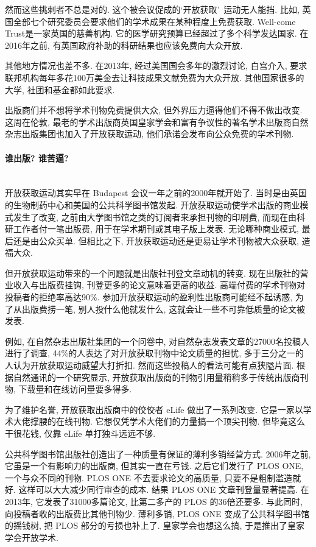 \documentclass[a4paper, 12pt, UTF8]{article}
\begin{document}
然而这些挑刺者不总是对的. 这个被会议促成的\lq 开放获取\rq\ 运动无人能挡. 比如, 英国全部七个研究委员会要求他们的学术成果在某种程度上免费获取. Well-come Trust是一家英国的慈善机构. 它的医学研究预算已经超过了多个科学发达国家. 在2016年之前, 有英国政府补助的科研结果也应该免费向大众开放.

其他地方情况也差不多. 在2013年, 经过美国国会多年的激烈讨论, 白宫介入, 要求联邦机构每年多花100万美金去让科技成果文献免费为大众开放. 其他国家很多的大学, 社团和基金都如此要求.

出版商们并不想将学术刊物免费提供大众, 但外界压力逼得他们不得不做出改变. 这周在伦敦, 最老的学术出版商英国皇家学会和富有争议性的著名学术出版商自然杂志出版集团也加入了开放获取运动, 他们承诺会发布向公众免费的学术刊物.

\paragraph*{\large 谁出版? 谁苦逼?} \hspace{10pt} \\

开放获取运动其实早在 Budapest 会议一年之前的2000年就开始了. 当时是由英国的生物制药中心和美国的公共科学图书馆发起. 开放获取运动使学术出版的商业模式发生了改变, 之前由大学图书馆之类的订阅者来承担刊物的印刷费, 而现在由科研工作者付一笔出版费, 用于在学术期刊或其电子版上发表. 无论哪种商业模式, 最后还是由公众买单. 但相比之下, 开放获取运动还是更易让学术刊物被大众获取, 造福大众.

但开放获取运动带来的一个问题就是出版社刊登文章动机的转变. 现在出版社的营业收入与出版费挂钩, 刊登更多的论文意味着更高的收益. 高端付费的学术刊物对投稿者的拒绝率高达90\%. 参加开放获取运动的盈利性出版商可能经不起诱惑, 为了从出版费捞一笔, 别人投什么他就发什么, 这就会让一些不可靠低质量的论文被发表.

例如, 在自然杂志出版社集团的一个问卷中, 对自然杂志发表文章的27000名投稿人进行了调查, 44\%的人表达了对开放获取刊物中论文质量的担忧, 多于三分之一的人认为开放获取运动威望大打折扣. 然而这些投稿人的看法可能有点狭隘片面. 根据自然通讯的一个研究显示, 开放获取出版商的刊物引用量稍稍多于传统出版商刊物, 下载量和在线访问量要多得多.

为了维护名誉, 开放获取出版商中的佼佼者 eLife 做出了一系列改变. 它是一家以学术大佬撑腰的在线刊物. 它想仅凭学术大佬们的力量搞一个顶尖刊物. 但毕竟这么干很花钱, 仅靠 eLife 单打独斗远远不够.

公共科学图书馆出版社创造出了一种质量有保证的薄利多销经营方式. 2006年之前, 它虽是一个有影响力的出版商, 但其实一直在亏钱. 之后它们发行了 PLOS ONE, 一个与众不同的刊物. PLOS ONE 不去要求论文的高质量, 只要不是粗制滥造就好. 这样可以大大减少同行审查的成本. 结果 PLOS ONE 文章刊登量显著提高. 在2013年, 它发表了31000多篇论文, 比第二多产的 PLOS 的36倍还要多. 与此同时, 向投稿者收的出版费比其他刊物少. 薄利多销, PLOS ONE 变成了公共科学图书馆的摇钱树, 把 PLOS 部分的亏损也补上了. 皇家学会也想这么搞, 于是推出了皇家学会开放学术.
\end{document}
